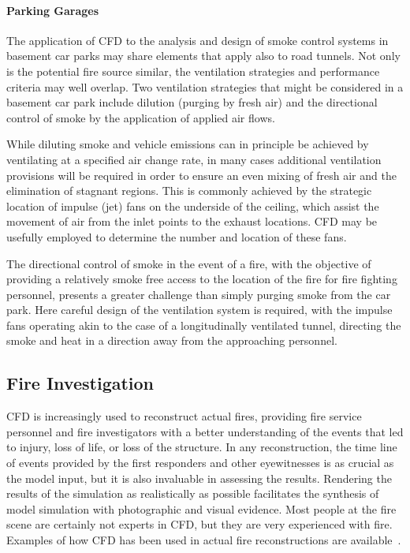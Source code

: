 \documentclass[graybox]{svmult}
\begin{document}
\paragraph{Parking Garages}

The application of CFD to the analysis and design of smoke control systems in basement car parks may share elements that apply also to road tunnels. Not only is the potential fire source similar, the ventilation strategies and performance criteria may well overlap. Two ventilation strategies that might be considered in a basement car park include dilution (purging by fresh air) and the directional control of smoke by the application of applied air flows.

While diluting smoke and vehicle emissions can in principle be achieved by ventilating at a specified air change rate, in many cases additional ventilation provisions will be required in order to ensure an even mixing of fresh air and the elimination of stagnant regions. This is commonly achieved by the strategic location of impulse (jet) fans on the underside of the ceiling, which assist the movement of air from the inlet points to the exhaust locations. CFD may be usefully employed to determine the number and location of these fans.

The directional control of smoke in the event of a fire, with the objective of providing a relatively smoke free access to the location of the fire for fire fighting personnel, presents a greater challenge than simply purging smoke from the car park. Here careful design of the ventilation system is required, with the impulse fans operating akin to the case of a longitudinally ventilated tunnel, directing the smoke and heat in a direction away from the approaching personnel.



\subsection{Fire Investigation}

CFD is increasingly used to reconstruct  actual  fires,  providing  fire  service  personnel and fire investigators with a better understanding of the events that led to injury, loss of life, or loss of the structure. In any reconstruction, the time line of events provided by the first responders and other eyewitnesses is as crucial as the model input, but it is also invaluable in assessing the results. Rendering the results of the simulation as realistically as possible facilitates the synthesis of model simulation with photographic and visual evidence. Most people at the fire scene are certainly not experts in CFD, but they are very experienced with fire. Examples of how CFD has been used in actual fire reconstructions are available~\cite{Grosshandler, McGrattan:2005, Madrzykowski:2000, Madrzykowski:2004, Christensen}.
\end{document}
